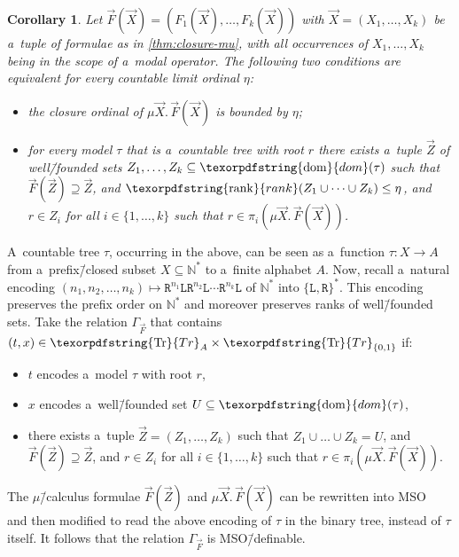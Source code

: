 \documentclass[11pt,a4paper]{amsart}
\theoremstyle{plain}
\newtheorem{cor}[thm]{Corollary}
\theoremstyle{definition}
\theoremstyle{defC}
\theoremstyle{thmC}
\theoremstyle{plain}
\numberwithin{equation}{section}
\numberwithin{equation}{section}
\numberwithin{figure}{section}
\newcommand{\ident}[1]{\ensuremath{\texorpdfstring{\mathrm{\mathnm{#1}}}{#1}}\xspace}
\newcommand{\domain}[1]{\ensuremath{\mathbb{#1}}\xspace}
\newcommand{\N}{\domain{N}}
\newcommand{\from}{\colon}
\newcommand{\dom}{\ident{dom}}
\newcommand{\dL}{\mathtt{{\scriptstyle L}}}
\newcommand{\dR}{\mathtt{{\scriptstyle R}}}
\newcommand{\mathnm}[1]{#1}
\newcommand{\trees}{\ident{Tr}}
\newcommand{\rank}{\ident{rank}}
\begin{document}
\begin{cor}\label{cor:mu-tree}
	Let $\vec{F}(\vec{X})=(F_1(\vec{X}),\dots,F_k(\vec{X}))$ with $\vec{X}=(X_1,\dots,X_k)$ be a~tuple of formulae as in \cref{thm:closure-mu}, with all occurrences of $X_1,\dots,X_k$ being in the scope of a~modal operator.
	The following two conditions are equivalent for every countable limit ordinal $\eta$:
	\begin{itemize}
	\item	the closure ordinal of $\mu \vec{X}.\,\vec{F}(\vec{X})$ is bounded by $\eta$;
	\item	for every model $\tau$ that is a~countable tree with root $r$ there exists a~tuple $\vec{Z}$ of well\=/founded sets $Z_1,\dots,Z_k\subseteq\dom(\tau)$
		such that $\vec{F}(\vec{Z})\supseteq\vec{Z}$, and $\rank(Z_1\cup\dots\cup Z_k)\leq\eta$, and $r\in Z_i$ for all $i\in\{1,\dots,k\}$ such that $r\in\pi_i(\mu \vec{X}.\,\vec{F}(\vec{X}))$.
	\end{itemize}
\end{cor}
\noindent %
A~countable tree $\tau$, occurring in the  above, can be seen as a~function $\tau\from X\to A$ from a~prefix\=/closed subset $X\subseteq\N^\ast$ to a~finite alphabet $A$.
Now, recall a~natural encoding $(n_1,n_2,\ldots,n_k)\mapsto \dR^{n_1}\dL\dR^{n_2}\dL\cdots\dR^{n_k}\dL$ of $\N^\ast$ into $\{\dL,\dR\}^\ast$.
This encoding preserves the prefix order on $\N^\ast$ and moreover preserves ranks of well\=/founded sets.
Take the relation $\Gamma_{\!\!\vec{F}}$ that contains $(t,x)\in\trees_A\times\trees_{\{0,1\}}$ if:
\begin{itemize}
\item	$t$ encodes a~model $\tau$ with root $r$,
\item	$x$ encodes a~well\=/founded set $U\subseteq\dom(\tau)$,
\item	there exists a~tuple $\vec{Z}=(Z_1,\dots,Z_k)$ such that $Z_1\cup\dots\cup Z_k=U$, and $\vec{F}(\vec{Z})\supseteq\vec{Z}$,
	and $r\in Z_i$ for all $i\in\{1,\dots,k\}$ such that $r\in\pi_i(\mu \vec{X}.\,\vec{F}(\vec{X}))$.
\end{itemize}
The $\mu$\=/calculus formulae $\vec{F}(\vec{Z})$ and $\mu\vec{X}.\,\vec{F}(\vec{X})$ can be rewritten into MSO~\cite{julian-igor-handook}
and then modified to read the above encoding of $\tau$ in the binary tree, instead of $\tau$ itself.
It follows that the relation $\Gamma_{\!\!\vec{F}}$ is MSO\=/definable.
\end{document}
